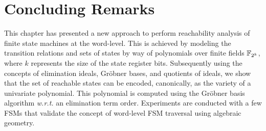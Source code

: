
\section{Concluding Remarks}
This chapter has presented a new approach to perform reachability
analysis of finite state machines at the word-level. This is achieved
by modeling the transition relations and sets of states by way of
polynomials over finite fields ${\mathbb{F}}_{2^k}$, where $k$ represents the size
of the state register bits. Subsequently using the concepts of
elimination ideals, Gr\"obner bases, and quotients of ideals, we show
that the set of reachable states can be encoded, canonically, as the
variety of a univariate polynomial. This polynomial is computed using
the Gr\"obner basis algorithm {\it w.r.t.} an elimination term
order. Experiments are conducted with a few FSMs that validate the
concept of word-level FSM traversal using algebraic geometry. 

